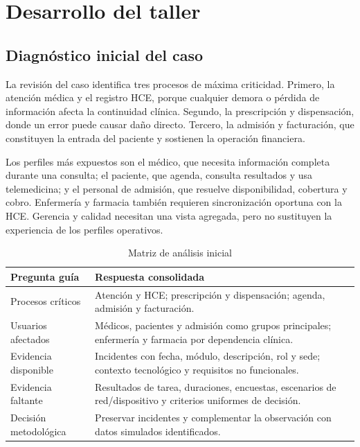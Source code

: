 \section{Desarrollo del taller}

\subsection{Diagnóstico inicial del caso}


La revisión del caso identifica tres procesos de máxima criticidad. Primero, la atención médica y el registro HCE, porque cualquier demora o pérdida de información afecta la continuidad clínica. Segundo, la prescripción y dispensación, donde un error puede causar daño directo. Tercero, la admisión y facturación, que constituyen la entrada del paciente y sostienen la operación financiera.

Los perfiles más expuestos son el médico, que necesita información completa durante una consulta; el paciente, que agenda, consulta resultados y usa telemedicina; y el personal de admisión, que resuelve disponibilidad, cobertura y cobro. Enfermería y farmacia también requieren sincronización oportuna con la HCE. Gerencia y calidad necesitan una vista agregada, pero no sustituyen la experiencia de los perfiles operativos.

\begin{table}[H]
\centering
\caption{Matriz de análisis inicial}
\begin{tabularx}{\textwidth}{p{3.4cm}Y}
\toprule
Pregunta guía & Respuesta consolidada \\
\midrule
Procesos críticos & Atención y HCE; prescripción y dispensación; agenda, admisión y facturación. \\
Usuarios afectados & Médicos, pacientes y admisión como grupos principales; enfermería y farmacia por dependencia clínica. \\
Evidencia disponible & Incidentes con fecha, módulo, descripción, rol y sede; contexto tecnológico y requisitos no funcionales. \\
Evidencia faltante & Resultados de tarea, duraciones, encuestas, escenarios de red/dispositivo y criterios uniformes de decisión. \\
Decisión metodológica & Preservar incidentes y complementar la observación con datos simulados identificados. \\
\bottomrule
\end{tabularx}
\end{table}

